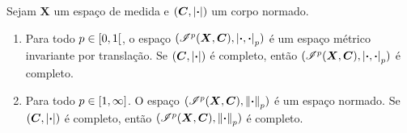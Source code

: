 \begin{proposition}
Sejam $\bm X$ um espaço de medida e $(\bm C,\left\vert{\bm{\cdot}}\right\vert)$ um corpo normado.
	\begin{enumerate}
	\item Para todo $p \in \left[0,\allowbreak 1\right[$, o espaço $(\mathscr{I}^p(\bm X,\bm C),\left\vert{\bm{\cdot}},{\bm{\cdot}}\right\vert_p)$ é um espaço métrico invariante por translação. Se $(\bm C,\left\vert{\bm{\cdot}}\right\vert)$ é completo, então $(\mathscr{I}^p(\bm X,\bm C),\left\vert{\bm{\cdot}},{\bm{\cdot}}\right\vert_p)$ é completo.

	\item Para todo $p \in \left[1,\allowbreak \infty\right]$. O espaço $(\mathscr{I}^p(\bm X,\bm C),\left\Vert{\bm{\cdot}}\right\Vert_p)$ é um espaço normado. Se $(\bm C,\left\vert{\bm{\cdot}}\right\vert)$ é completo, então $(\mathscr{I}^p(\bm X,\bm C),\left\Vert{\bm{\cdot}}\right\Vert_p)$ é completo.
	\end{enumerate}
\end{proposition}
